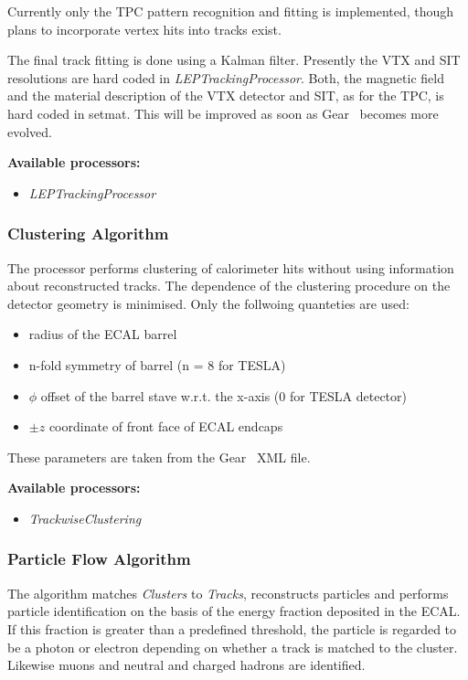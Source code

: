 Currently only the TPC pattern recognition and fitting is implemented, though
plans to incorporate vertex hits into tracks exist.

The final track fitting is done using a Kalman filter. Presently
the VTX and SIT resolutions are hard coded in {\em LEPTrackingProcessor}.
Both,
the magnetic field and the material description of
the VTX detector and SIT, as for the TPC, is hard coded in setmat.
This will be improved as soon as Gear~\cite{ref_gear} becomes more evolved.

{\bf Available processors:}
\begin{itemize}
\item {\em LEPTrackingProcessor}
\end{itemize}

\subsubsection{Clustering Algorithm}

The processor performs clustering of calorimeter hits without
using information about reconstructed tracks.
The dependence of the clustering procedure on the detector
geometry is minimised. Only the follwoing quanteties are used:
\begin{itemize}
\item radius of the ECAL barrel
\item n-fold symmetry of barrel (n = 8 for TESLA)
\item $\phi$ offset of the barrel stave w.r.t. the x-axis
      (0 for TESLA detector)
\item $\pm z$ coordinate of front face of ECAL endcaps
\end{itemize}
These parameters are taken from the Gear~\cite{ref_gear} XML file.

{\bf Available processors:}
\begin{itemize}
\item {\em TrackwiseClustering}
\end{itemize}

\subsubsection{Particle Flow Algorithm}

The algorithm matches {\em Clusters} to {\em Tracks}, reconstructs particles
and performs
particle identification on the basis of the energy fraction deposited
in the ECAL. If this fraction is greater than a predefined threshold,
the particle is regarded to be a photon or electron depending on
whether a track is matched to the cluster.
Likewise muons and neutral and charged hadrons are identified.

